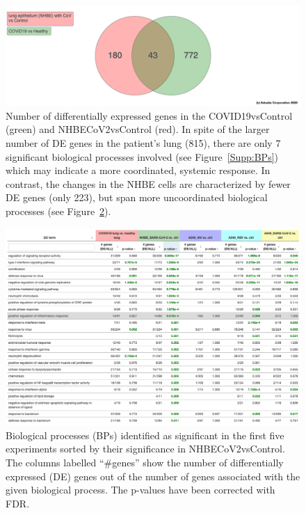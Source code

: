 \begin{figure}
\centering
	\includegraphics[width=1\linewidth]{Figures/meta_DEGs_patient_NHBE.png}
    \caption{Number of differentially expressed genes in the COVID19vsControl (green) and  NHBECoV2vsControl (red). In spite of the larger number of DE genes in the patient's lung (815), there are only 7 significant biological processes involved (see Figure~\ref{Supp:BPs}) which may indicate a more coordinated, systemic response. In contrast, the changes in the NHBE cells are characterized by fewer DE genes (only 223), but span more uncoordinated biological processes (see Figure~\ref{Supp:BP_orderedby_NHBE}).  }
        \label{Supp:Venngenes} 
\end{figure}


\begin{figure}
\centering
	\includegraphics[width=1\linewidth]{Figures/BPs_elim_FDR_all_orderedby_NHBE.png}
    \caption{Biological processes (BPs) identified as significant in the first five experiments sorted by their significance in NHBECoV2vsControl. The  columns labelled ``\#genes'' show the number of differentially expressed (DE) genes out of the number of genes associated with the given biological process. The p-values have been corrected with FDR. }
        \label{Supp:BP_orderedby_NHBE} 
\end{figure}

